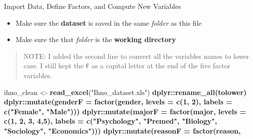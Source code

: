 \documentclass[]{article}
\newenvironment{Shaded}{\begin{snugshade}}{\end{snugshade}}
\newcommand{\KeywordTok}[1]{\textcolor[rgb]{0.13,0.29,0.53}{\textbf{#1}}}
\newcommand{\DataTypeTok}[1]{\textcolor[rgb]{0.13,0.29,0.53}{#1}}
\newcommand{\DecValTok}[1]{\textcolor[rgb]{0.00,0.00,0.81}{#1}}
\newcommand{\StringTok}[1]{\textcolor[rgb]{0.31,0.60,0.02}{#1}}
\newcommand{\OperatorTok}[1]{\textcolor[rgb]{0.81,0.36,0.00}{\textbf{#1}}}
\newcommand{\NormalTok}[1]{#1}
\providecommand{\tightlist}{%
  \setlength{\itemsep}{0pt}\setlength{\parskip}{0pt}}
\begin{document}
Import Data, Define Factors, and Compute New Variables

\begin{itemize}
\tightlist
\item
  Make sure the \textbf{dataset} is saved in the same \emph{folder} as
  this file
\item
  Make sure the that \emph{folder} is the \textbf{working directory}
\end{itemize}

\begin{quote}
NOTE: I added the second line to convert all the variables names to
lower case. I still kept the \texttt{F} as a capital letter at the end
of the five factor variables.
\end{quote}

\begin{Shaded}
\begin{Highlighting}[]
\NormalTok{ihno_clean <-}\StringTok{ }\KeywordTok{read_excel}\NormalTok{(}\StringTok{"Ihno_dataset.xls"}\NormalTok{) }\OperatorTok{%
\StringTok{  }\NormalTok{dplyr}\OperatorTok{::}\KeywordTok{rename_all}\NormalTok{(tolower) }\OperatorTok{%
\StringTok{  }\NormalTok{dplyr}\OperatorTok{::}\KeywordTok{mutate}\NormalTok{(}\DataTypeTok{genderF =} \KeywordTok{factor}\NormalTok{(gender, }
                                 \DataTypeTok{levels =} \KeywordTok{c}\NormalTok{(}\DecValTok{1}\NormalTok{, }\DecValTok{2}\NormalTok{),}
                                 \DataTypeTok{labels =} \KeywordTok{c}\NormalTok{(}\StringTok{"Female"}\NormalTok{, }
                                            \StringTok{"Male"}\NormalTok{))) }\OperatorTok{%
\StringTok{  }\NormalTok{dplyr}\OperatorTok{::}\KeywordTok{mutate}\NormalTok{(}\DataTypeTok{majorF =} \KeywordTok{factor}\NormalTok{(major, }
                                \DataTypeTok{levels =} \KeywordTok{c}\NormalTok{(}\DecValTok{1}\NormalTok{, }\DecValTok{2}\NormalTok{, }\DecValTok{3}\NormalTok{, }\DecValTok{4}\NormalTok{,}\DecValTok{5}\NormalTok{),}
                                \DataTypeTok{labels =} \KeywordTok{c}\NormalTok{(}\StringTok{"Psychology"}\NormalTok{,}
                                           \StringTok{"Premed"}\NormalTok{,}
                                           \StringTok{"Biology"}\NormalTok{,}
                                           \StringTok{"Sociology"}\NormalTok{,}
                                           \StringTok{"Economics"}\NormalTok{))) }\OperatorTok{%
\StringTok{  }\NormalTok{dplyr}\OperatorTok{::}\KeywordTok{mutate}\NormalTok{(}\DataTypeTok{reasonF =} \KeywordTok{factor}\NormalTok{(reason,}
}}}}
\end{Highlighting}
\end{Shaded}
\end{document}
